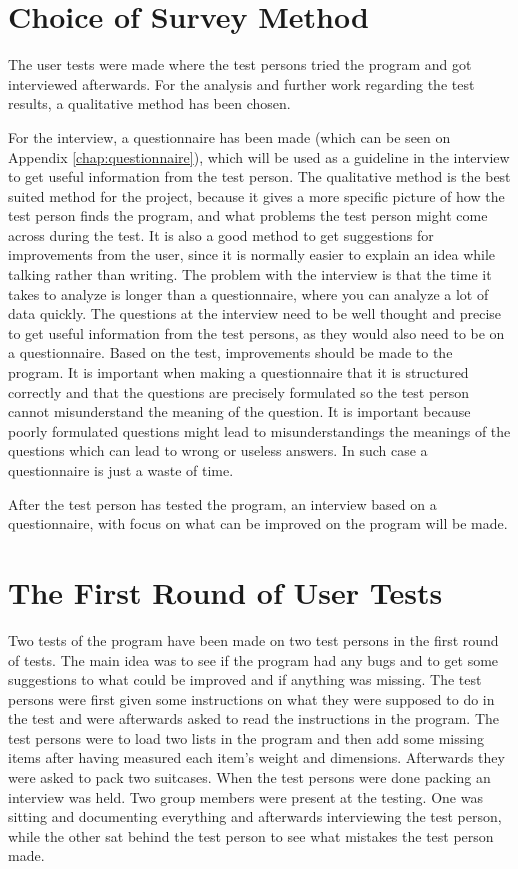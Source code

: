\section{Choice of Survey Method}
The user tests were made where the test persons tried the program and got interviewed afterwards. For the analysis and further work regarding the test results, a qualitative method has been chosen.

For the interview, a questionnaire has been made (which can be seen on Appendix \ref{chap:questionnaire}), which will be used as a guideline in the interview to get useful information from the test person. The qualitative method is the best suited method for the project, because it gives a more specific picture of how the test person finds the program, and what problems the test person might come across during the test. It is also a good method to get suggestions for improvements from the user, since it is normally easier to explain an idea while talking rather than writing. The problem with the interview is that the time it takes to analyze is longer than a questionnaire, where you can analyze a lot of data quickly. The questions at the interview need to be well thought and precise to get useful information from the test persons, as they would also need to be on a questionnaire. Based on the test, improvements should be made to the program.
It is important when making a questionnaire that it is structured correctly and that the questions are precisely formulated so the test person cannot misunderstand the meaning of the question. It is important because poorly formulated questions might lead to misunderstandings the meanings of the questions which can lead to wrong or useless answers. In such case a questionnaire is  just a waste of time.

After the test person has tested the program, an interview based on a questionnaire, with focus on what can be improved on the program will be made.

\section{The First Round of User Tests}
Two tests of the program have been made on two test persons in the first round of tests. The main idea was to see if the program had any bugs and to get some suggestions to what could be improved and if anything was missing. The test persons were first given some instructions on what they were supposed to do in the test and were afterwards asked to read the instructions in the program. The test persons were to load two lists in the program and then add some missing items after having measured each item's weight and dimensions. Afterwards they were asked to pack two suitcases. When the test persons were done packing an interview was held. Two group members were present at the testing. One was sitting and documenting everything and afterwards interviewing the test person, while the other sat behind the test person to see what mistakes the test person made.

